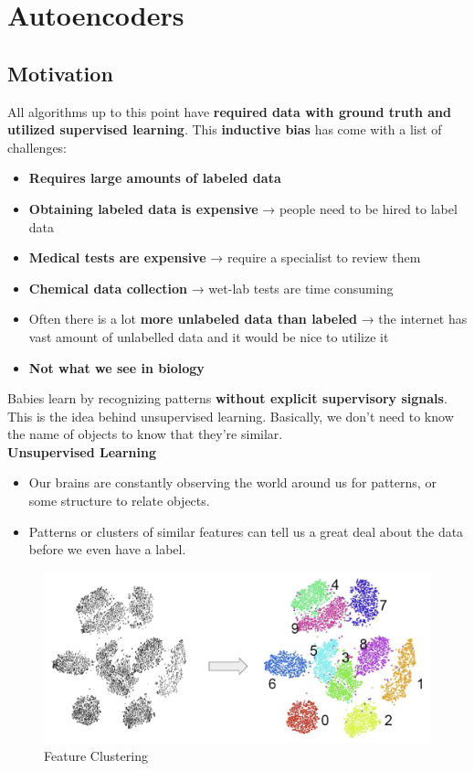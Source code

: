 \chapter{Autoencoders}

\section{Motivation}

All algorithms up to this point have \textbf{required data with ground truth and utilized supervised learning}. This \textbf{inductive bias} has come with a list of challenges: 

\begin{itemize}
    \item \textbf{Requires large amounts of labeled data}
    \item \textbf{Obtaining labeled data is expensive} → people need to be hired to label data
    \item \textbf{Medical tests are expensive} → require a specialist to review them
    \item \textbf{Chemical data collection} → wet-lab tests are time consuming
    \item Often there is a lot \textbf{more unlabeled data than labeled} → the internet has vast amount of unlabelled data and it would be nice to utilize it
    \item \textbf{Not what we see in biology}
\end{itemize}

Babies learn by recognizing patterns \textbf{without explicit supervisory signals}. This is the idea behind unsupervised learning. Basically, we don't need to know the name of objects to know that they're similar.\\

\textbf{Unsupervised Learning}
\begin{itemize}
    \item Our brains are constantly observing the world around us for patterns, or some
structure to relate objects.
\item Patterns or clusters of similar features can tell us a great deal about the data
before we even have a label.
\end{itemize}

\begin{figure}[h!t]
    \centering
    \includegraphics[width=0.5\linewidth]{featureclustering.png}
    \caption{Feature Clustering}
    \label{fig:enter-label}
\end{figure}

